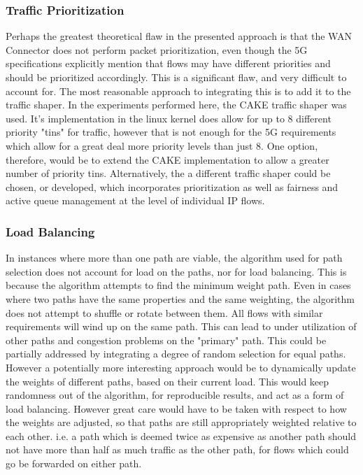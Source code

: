 \subsubsection{Traffic Prioritization}

Perhaps the greatest theoretical flaw in the presented approach is that the WAN Connector does not perform packet prioritization, even though the 5G specifications explicitly mention that flows may have different priorities and should be prioritized accordingly. This is a significant flaw, and very difficult to account for. The most reasonable approach to integrating this is to add it to the traffic shaper. In the experiments performed here, the CAKE traffic shaper was used. It's implementation in the linux kernel does allow for up to 8 different priority 
"tins" for traffic, however that is not enough for the 5G requirements which allow for a great deal more priority levels than just 8. One option, therefore, would be to extend the CAKE implementation to allow a greater number of priority tins. Alternatively, the a different traffic shaper could be chosen, or developed, which incorporates prioritization as well as fairness and active queue management at the level of individual IP flows.


\subsubsection{Load Balancing}

In instances where more than one path are viable, the algorithm used for path selection does not account for load on the paths, nor for load balancing. This is because the algorithm attempts to find the minimum weight path. Even in cases where two paths have the same properties and the same weighting, the algorithm does not attempt to shuffle or rotate between them. All flows with similar requirements will wind up on the same path. This can lead to under utilization of other paths and congestion problems on the "primary" path. This could be partially addressed by integrating a degree of random selection for equal paths. However a potentially more interesting approach would be to dynamically update the weights of different paths, based on their current load. This would keep randomness out of the algorithm, for reproducible results, and act as a form of load balancing. However great care would have to be taken with respect to how the weights are adjusted, so that paths are still appropriately weighted relative to each other. i.e. a path which is deemed twice as expensive as another path should not have more than half as much traffic as the other path, for flows which could go be forwarded on either path.














